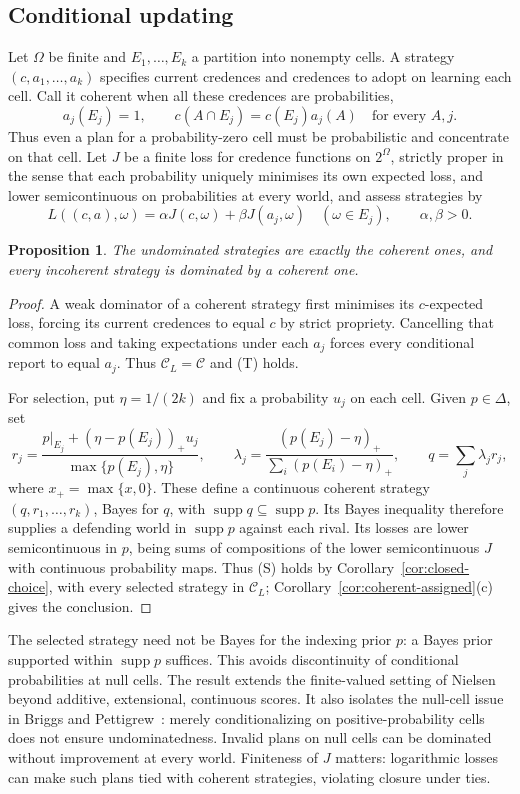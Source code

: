 \documentclass[11pt]{article}
\newtheorem{proposition}[theorem]{Proposition}
\theoremstyle{definition}
\theoremstyle{remark}
\newcommand{\C}{\mathcal C}
\newcommand{\supp}{\operatorname{supp}}
\begin{document}
\subsection{Conditional updating}
Let $\Omega$ be finite and $E_1,\ldots,E_k$ a partition into nonempty cells. A strategy $(c,a_1,\ldots,a_k)$ specifies current credences and credences to adopt on learning each cell. Call it coherent when all these credences are probabilities,
\[
a_j(E_j)=1,\qquad c(A\cap E_j)=c(E_j)a_j(A)\quad\text{for every }A,j.
\]
Thus even a plan for a probability-zero cell must be probabilistic and concentrate on that cell. Let $J$ be a finite loss for credence functions on $2^\Omega$, strictly proper in the sense that each probability uniquely minimises its own expected loss, and lower semicontinuous on probabilities at every world, and assess strategies by
\[
L((c,a),\omega)=\alpha J(c,\omega)+\beta J(a_j,\omega)
\quad(\omega\in E_j),\qquad \alpha,\beta>0.
\]
\begin{proposition}\label{prop:short-updating}
The undominated strategies are exactly the coherent ones, and every incoherent strategy is dominated by a coherent one.
\end{proposition}
\begin{proof}
A weak dominator of a coherent strategy first minimises its $c$-expected loss, forcing its current credences to equal $c$ by strict propriety. Cancelling that common loss and taking expectations under each $a_j$ forces every conditional report to equal $a_j$. Thus $\C_L=\C$ and (T) holds.

For selection, put $\eta=1/(2k)$ and fix a probability $u_j$ on each cell. Given $p\in\Delta$, set
\[
r_j=\frac{p|_{E_j}+(\eta-p(E_j))_+u_j}{\max\{p(E_j),\eta\}},\qquad
\lambda_j=\frac{(p(E_j)-\eta)_+}{\sum_i(p(E_i)-\eta)_+},\qquad
q=\sum_j\lambda_jr_j,
\]
where $x_+=\max\{x,0\}$. These define a continuous coherent strategy $(q,r_1,\ldots,r_k)$, Bayes for $q$, with $\supp q\subseteq\supp p$. Its Bayes inequality therefore supplies a defending world in $\supp p$ against each rival. Its losses are lower semicontinuous in $p$, being sums of compositions of the lower semicontinuous $J$ with continuous probability maps. Thus (S) holds by Corollary~\ref{cor:closed-choice}, with every selected strategy in $\C_L$; Corollary~\ref{cor:coherent-assigned}(c) gives the conclusion.
\end{proof}
The selected strategy need not be Bayes for the indexing prior $p$: a Bayes prior supported within $\supp p$ suffices. This avoids discontinuity of conditional probabilities at null cells. The result extends the finite-valued setting of Nielsen~\cite{Nielsen2021} beyond additive, extensional, continuous scores. It also isolates the null-cell issue in Briggs and Pettigrew~\cite{Briggs2020}: merely conditionalizing on positive-probability cells does not ensure undominatedness. Invalid plans on null cells can be dominated without improvement at every world. Finiteness of $J$ matters: logarithmic losses can make such plans tied with coherent strategies, violating closure under ties.
\end{document}
